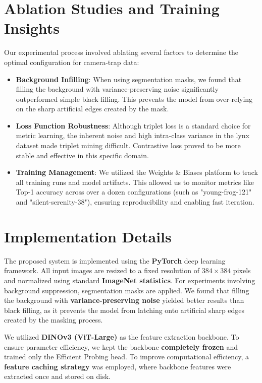 \documentclass{article}
\begin{document}
\section{Ablation Studies and Training Insights}
Our experimental process involved ablating several factors to determine the optimal configuration for camera-trap data:
\begin{itemize}
    \item \textbf{Background Infilling}: When using segmentation masks, we found that filling the background with variance-preserving noise significantly outperformed simple black filling. This prevents the model from over-relying on the sharp artificial edges created by the mask.
    \item \textbf{Loss Function Robustness}: Although triplet loss is a standard choice for metric learning, the inherent noise and high intra-class variance in the lynx dataset made triplet mining difficult. Contrastive loss proved to be more stable and effective in this specific domain.
    \item \textbf{Training Management}: We utilized the Weights \& Biases platform to track all training runs and model artifacts. This allowed us to monitor metrics like Top-1 accuracy across over a dozen configurations (such as "young-frog-121" and "silent-serenity-38"), ensuring reproducibility and enabling fast iteration.
\end{itemize}

\section{Implementation Details}

The proposed system is implemented using the \textbf{PyTorch} deep learning framework. All input images are resized to a fixed resolution of $384 \times 384$ pixels and normalized using standard \textbf{ImageNet statistics}. For experiments involving background suppression, segmentation masks are applied. We found that filling the background with \textbf{variance-preserving noise} yielded better results than black filling, as it prevents the model from latching onto artificial sharp edges created by the masking process.

We utilized \textbf{DINOv3 (ViT-Large)} as the feature extraction backbone. To ensure parameter efficiency, we kept the backbone \textbf{completely frozen} and trained only the Efficient Probing head. To improve computational efficiency, a \textbf{feature caching strategy} was employed, where backbone features were extracted once and stored on disk.
\end{document}
